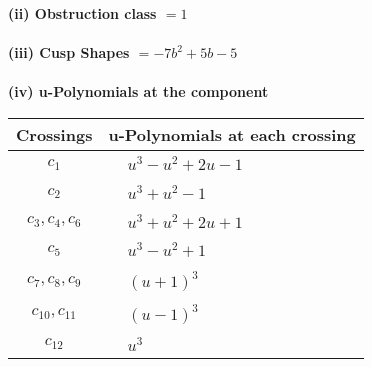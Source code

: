 \documentclass[1p]{elsarticle_modified}
\theoremstyle{definition}
\begin{document}
\flushleft \textbf{(ii) Obstruction class $= 1$}\\~\\
\flushleft \textbf{(iii) Cusp Shapes $= -7 b^2+5 b-5$}\\~\\
\newpage\renewcommand{\arraystretch}{1}
\flushleft \textbf{(iv) u-Polynomials at the component}\newline \\
\begin{tabular}{m{50pt}|m{274pt}}
Crossings & \hspace{64pt}u-Polynomials at each crossing \\
\hline $$\begin{aligned}c_{1}\end{aligned}$$&$\begin{aligned}
&u^3- u^2+2 u-1
\end{aligned}$\\
\hline $$\begin{aligned}c_{2}\end{aligned}$$&$\begin{aligned}
&u^3+u^2-1
\end{aligned}$\\
\hline $$\begin{aligned}c_{3},c_{4},c_{6}\end{aligned}$$&$\begin{aligned}
&u^3+u^2+2 u+1
\end{aligned}$\\
\hline $$\begin{aligned}c_{5}\end{aligned}$$&$\begin{aligned}
&u^3- u^2+1
\end{aligned}$\\
\hline $$\begin{aligned}c_{7},c_{8},c_{9}\end{aligned}$$&$\begin{aligned}
&(u+1)^3
\end{aligned}$\\
\hline $$\begin{aligned}c_{10},c_{11}\end{aligned}$$&$\begin{aligned}
&(u-1)^3
\end{aligned}$\\
\hline $$\begin{aligned}c_{12}\end{aligned}$$&$\begin{aligned}
&u^3
\end{aligned}$\\
\hline
\end{tabular}\\~\\
\end{document}
